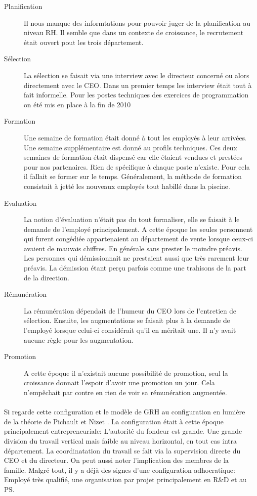\begin{description}
    \item[Planification] Il nous manque des informtations pour pouvoir juger de la planification au niveau RH. Il semble que dans un contexte de croissance, le recrutement était ouvert pout les trois département.
    \item[Sélection] La sélection se faisait via une interview avec le directeur concerné ou alors directement avec le CEO. Dans un premier temps les interview était tout à fait informelle. Pour les postes techniques des exercices de programmation on été mis en place à la fin de 2010
    \item[Formation] Une semaine de formation était donné à tout les employés à leur arrivées. Une semaine supplémentaire est donné au profils techniques. Ces deux semaines de formation était dispensé car elle étaient vendues et prestées pour nos partenaires. Rien de spécifique à chaque poste n'existe. Pour cela il fallait se former sur le temps. Généralement, la méthode de formation consistait à jetté les nouveaux employés tout habillé dans la piscine.
    \item[Evaluation] La notion d'évaluation n'était pas du tout formaliser, elle se faisait à le demande de l'employé principalement. A cette époque les seules personnent qui furent congédiée appartenaient au département de vente lorsque ceux-ci avaient de mauvais chiffres. En générale sans prester le moindre préavis. Les personnes qui démissionnait ne prestaient aussi que très rarement leur préavis. La démission étant perçu parfois comme une trahisons de la part de la direction.
    \item[Rémunération] La rémunération dépendait de l'humeur du CEO lors de l'entretien de sélection. Ensuite, les augmentations se faisait plus à la demande de l'employé lorsque celui-ci considérait qu'il en méritait une. Il n'y avait aucune règle pour les augmentation.
    \item[Promotion] A cette époque il n'existait aucune possibilité de promotion, seul la croissance donnait l'espoir d'avoir une promotion un jour. Cela n'empêchait par contre en rien de voir sa rémunération augmentée. 
\end{description}

 

\paragraph{}Si regarde cette configuration et le modèle de GRH au configuration en lumière de la théorie de Pichault et Nizet \citep[pp. 48-49]{pichault}.
La configuration était à cette époque principalement entrepreneuriale: L'autorité du fondeur est grande. Une grande division du travail vertical mais faible au niveau horizontal, en tout cas intra département. La coordinatation du travail se fait via la supervision directe du CEO et du directeur. On peut aussi noter l'implication des membres de la famille. Malgré tout, il y a déjà des signes d'une configuration adhocratique: Employé très qualifié, une organisation par projet principalement en R\&D et au PS. 

